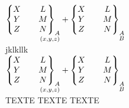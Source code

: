 \documentclass{minimal}
\newcommand{\torseurs}[8]{ 
\begin{Bmatrix} 
  {#1} & \, & {#4} \\ 
  {#2} & \, & {#5} \\ 
  {#3} & \, & {#6} 
\end{Bmatrix}_{#7\underset{\llap{$\scriptstyle#8$}}{}} 
}
\begin{document}
 

\noindent$\torseurs{X}{Y}{Z}{L}{M}{N}{A}{(x,y,z)}+\torseurs{X}{Y}{Z}{L}{M}{N}{A}{B}$
\\
jklkllk
\\ 
$\torseurs{X}{Y}{Z}{L}{M}{N}{A}{(x,y,z)}+\torseurs{X}{Y}{Z}{L}{M}{N}{A}{B}$\\ 
TEXTE TEXTE TEXTE 
\end{document}
